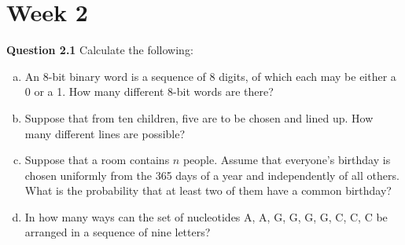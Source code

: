 \documentclass{article}
\begin{document}
\section*{Week 2}
{\bf Question 2.1}
Calculate the following:
\begin{enumerate}[(a)]
    \item An 8-bit binary word is a sequence of 8 digits, of which each may be either a 0 or a 1. How many different 8-bit words are there?
    \item Suppose that from ten children, five are to be chosen and lined up. How many different lines are possible? 
    \item Suppose that a room contains $n$ people. Assume that everyone's birthday is chosen uniformly from the 365 days of a year and independently of all others.  What is the probability that at least two of them have a common birthday?
    \item In how many ways can the set of nucleotides {A, A, G, G, G, G, C, C, C} be arranged in a sequence of nine letters?
\end{enumerate}
\end{document}
